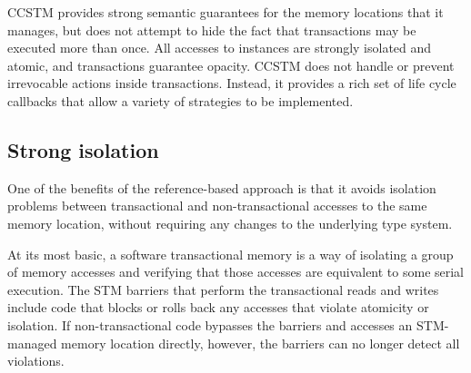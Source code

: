 
CCSTM provides strong semantic guarantees for the memory locations that it
manages, but does not attempt to hide the fact that transactions may be
executed more than once.  All accesses to  instances are strongly
isolated and atomic, and transactions guarantee opacity.  CCSTM does not
handle or prevent irrevocable actions inside transactions.  Instead, it provides a
rich set of life cycle callbacks that allow a variety of strategies to be
implemented.

\subsection{Strong isolation}

One of the benefits of the reference-based approach is that it avoids
isolation problems between transactional and non-transactional accesses to
the same memory location, without requiring any changes to the underlying
type system.

At its most basic, a software transactional memory is a way of isolating a
group of memory accesses and verifying that those accesses are equivalent
to some serial execution.  The STM barriers that perform the transactional
reads and writes include code that blocks or rolls back any accesses that
violate atomicity or isolation.  If non-transactional code bypasses the
barriers and accesses an STM-managed memory location directly, however,
the barriers can no longer detect all violations.


